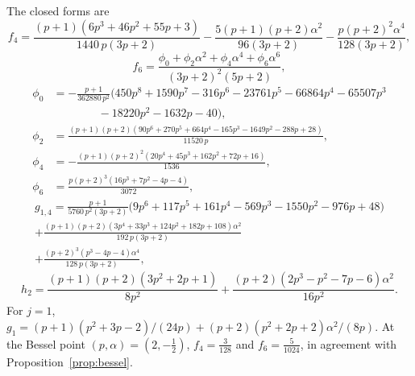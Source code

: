 The closed forms are
\begin{equation}\label{eq:f4}
  f_4=\frac{(p+1)(6p^3+46p^2+55p+3)}{1440\,p(3p+2)}-\frac{5(p+1)(p+2)\alpha^2}{96(3p+2)}-\frac{p(p+2)^2\alpha^4}{128(3p+2)},
\end{equation}
\begin{equation}\label{eq:f6}
  f_6=\frac{\phi_0+\phi_2\alpha^2+\phi_4\alpha^4+\phi_6\alpha^6}{(3p+2)^2(5p+2)},
\end{equation}
\begin{align*}
  \phi_0&=-\frac{p+1}{362880\,p^2}\bigl(450p^8+1590p^7-316p^6-23761p^5-66864p^4-65507p^3\\
  &\qquad\qquad-18220p^2-1632p-40\bigr),\\
  \phi_2&=\frac{(p+1)(p+2)(90p^6+270p^5+664p^4-165p^3-1649p^2-288p+28)}{11520\,p},\\
  \phi_4&=-\frac{(p+1)(p+2)^2(20p^4+45p^3+162p^2+72p+16)}{1536},\\
  \phi_6&=\frac{p(p+2)^3(16p^3+7p^2-4p-4)}{3072},
\end{align*}
\begin{multline}\label{eq:g14}
  g_{1,4}=\frac{p+1}{5760\,p^2(3p+2)}\bigl(9p^6+117p^5+161p^4-569p^3-1550p^2-976p+48\bigr)\\
  +\frac{(p+1)(p+2)(3p^4+33p^3+124p^2+182p+108)\alpha^2}{192\,p(3p+2)}\\
  +\frac{(p+2)^3(p^3-4p-4)\alpha^4}{128\,p(3p+2)},
\end{multline}
\begin{equation}\label{eq:h2}
  h_2=\frac{(p+1)(p+2)(3p^2+2p+1)}{8p^2}+\frac{(p+2)(2p^3-p^2-7p-6)\alpha^2}{16p^2}.
\end{equation}
For $j=1$, $g_1=(p+1)(p^2+3p-2)/(24p)+(p+2)(p^2+2p+2)\alpha^2/(8p)$. At the Bessel point $(p,\alpha)=(2,-\frac12)$,
$f_4=\frac3{128}$ and $f_6=\frac5{1024}$, in agreement with Proposition~\ref{prop:bessel}.

